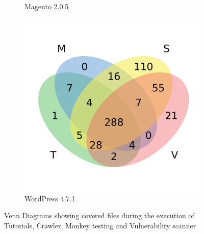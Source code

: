 \begin{figure}[t]
\begin{subfigure}[b]{0.24\textwidth}
          \caption{\scriptsize Magento 2.0.5}
          \label{fig:venn_mgt}
    \end{subfigure}
    \begin{subfigure}[b]{0.24\textwidth}
          \includegraphics[width=\textwidth]{figures/lim/venn_wp.pdf}
          \caption{\scriptsize WordPress 4.7.1}
          \label{fig:venn_wp}
    \end{subfigure}
  \caption{Venn Diagrams showing covered files during the execution of Tutorials, Crawler, Monkey testing and Vulnerability scanner}
  \label{fig:venncoverage}
\end{figure}



